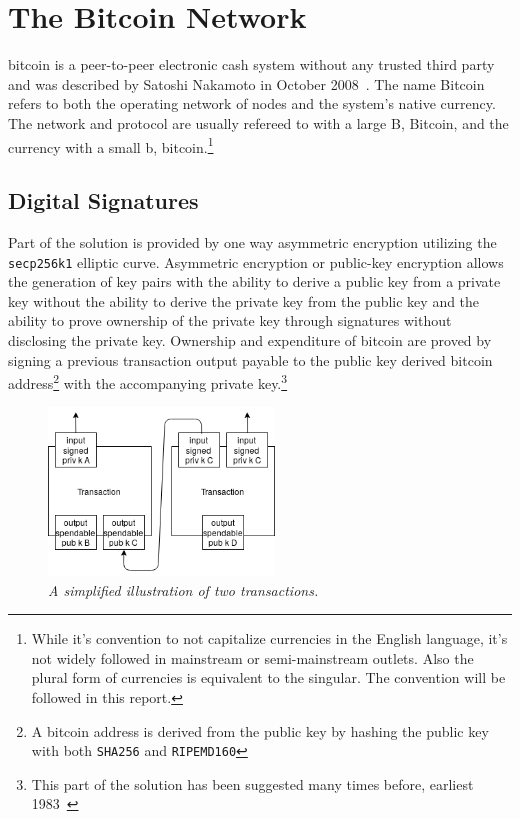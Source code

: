 \chapter{The Bitcoin Network}
	\label{sec:bitcoin}

\gls{bitcoin} is a peer-to-peer electronic cash system without any trusted third party and was described by Satoshi Nakamoto in October 2008~\cite{nakamoto:bitcoin}. The name Bitcoin refers to both the operating network of \gls{node}s and the system's native currency. The network and protocol are usually refereed to with a large B, Bitcoin, and the currency with a small b, bitcoin.\footnote{While it's convention to not capitalize currencies in the English language, it's not widely followed in mainstream or semi-mainstream outlets. Also the plural form of currencies is equivalent to the singular. The convention will be followed in this report.}

\vspace*{-0.5cm}

\section{Digital Signatures}

Part of the solution is provided by one way asymmetric encryption utilizing the \texttt{secp256k1} elliptic curve. Asymmetric encryption or public-key encryption allows the generation of key pairs with the ability to derive a public key from a private key without the ability to derive the private key from the public key and the ability to prove ownership of the private key through signatures without disclosing the private key. Ownership and expenditure of bitcoin are proved by signing a previous transaction output payable to the public key derived bitcoin address\footnote{A bitcoin address is derived from the public key by \gls{hash}ing the public key with both \texttt{SHA256} and \texttt{RIPEMD160}} with the accompanying private key.\footnote{This part of the solution has been suggested many times before, earliest 1983~\cite{chaum:blind:signatures}}

\begin{figure}[!htb]

	\centering
	\includegraphics[width=6cm]{images/transaction.png}
	\caption{\textit{A simplified illustration of two transactions. 
	}}
	\label{fig:two:tx}

\end{figure}

